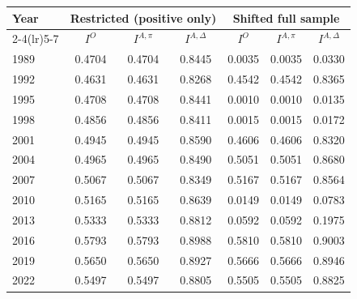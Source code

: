 \begin{tabular}{lcccccc}
\toprule
Year & \multicolumn{3}{c}{Restricted (positive only)} & \multicolumn{3}{c}{Shifted full sample} \\
\cmidrule(lr){2-4}\cmidrule(lr){5-7}
& $I^{O}$ & $I^{A,\pi}$ & $I^{A,\Delta}$ & $I^{O}$ & $I^{A,\pi}$ & $I^{A,\Delta}$ \\
\midrule
1989 & 0.4704 & 0.4704 & 0.8445 & 0.0035 & 0.0035 & 0.0330 \\
1992 & 0.4631 & 0.4631 & 0.8268 & 0.4542 & 0.4542 & 0.8365 \\
1995 & 0.4708 & 0.4708 & 0.8441 & 0.0010 & 0.0010 & 0.0135 \\
1998 & 0.4856 & 0.4856 & 0.8411 & 0.0015 & 0.0015 & 0.0172 \\
2001 & 0.4945 & 0.4945 & 0.8590 & 0.4606 & 0.4606 & 0.8320 \\
2004 & 0.4965 & 0.4965 & 0.8490 & 0.5051 & 0.5051 & 0.8680 \\
2007 & 0.5067 & 0.5067 & 0.8349 & 0.5167 & 0.5167 & 0.8564 \\
2010 & 0.5165 & 0.5165 & 0.8639 & 0.0149 & 0.0149 & 0.0783 \\
2013 & 0.5333 & 0.5333 & 0.8812 & 0.0592 & 0.0592 & 0.1975 \\
2016 & 0.5793 & 0.5793 & 0.8988 & 0.5810 & 0.5810 & 0.9003 \\
2019 & 0.5650 & 0.5650 & 0.8927 & 0.5666 & 0.5666 & 0.8946 \\
2022 & 0.5497 & 0.5497 & 0.8805 & 0.5505 & 0.5505 & 0.8825 \\
\bottomrule
\end{tabular}

